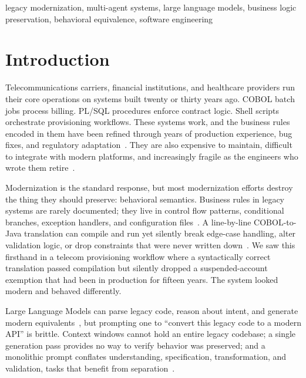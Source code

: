 \documentclass[conference]{IEEEtran}
\begin{document}
\begin{IEEEkeywords}
legacy modernization, multi-agent systems, large language models, business logic preservation, behavioral equivalence, software engineering
\end{IEEEkeywords}

\section{Introduction}

Telecommunications carriers, financial institutions, and healthcare providers run their core operations on systems built twenty or thirty years ago. COBOL batch jobs process billing. PL/SQL procedures enforce contract logic. Shell scripts orchestrate provisioning workflows. These systems work, and the business rules encoded in them have been refined through years of production experience, bug fixes, and regulatory adaptation~\cite{comella2000survey}. They are also expensive to maintain, difficult to integrate with modern platforms, and increasingly fragile as the engineers who wrote them retire~\cite{breivold2012systematic}.

Modernization is the standard response, but most modernization efforts destroy the thing they should preserve: behavioral semantics. Business rules in legacy systems are rarely documented; they live in control flow patterns, conditional branches, exception handlers, and configuration files~\cite{kazman1998requirements}. A line-by-line COBOL-to-Java translation can compile and run yet silently break edge-case handling, alter validation logic, or drop constraints that were never written down~\cite{rugaber2004model}. We saw this firsthand in a telecom provisioning workflow where a syntactically correct translation passed compilation but silently dropped a suspended-account exemption that had been in production for fifteen years. The system looked modern and behaved differently.

Large Language Models can parse legacy code, reason about intent, and generate modern equivalents~\cite{chen2021evaluating, li2023starcoder}, but prompting one to ``convert this legacy code to a modern API'' is brittle. Context windows cannot hold an entire legacy codebase; a single generation pass provides no way to verify behavior was preserved; and a monolithic prompt conflates understanding, specification, transformation, and validation, tasks that benefit from separation~\cite{hou2024llm4se}.
\end{document}
